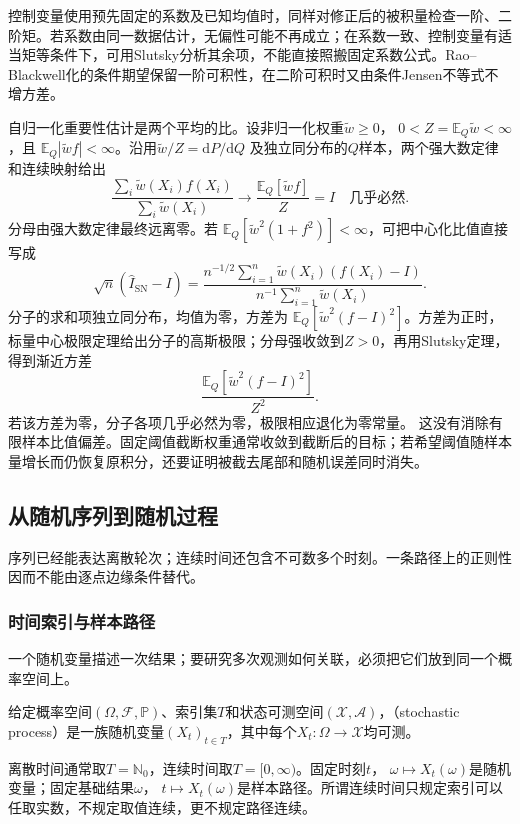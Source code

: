控制变量使用预先固定的系数及已知均值时，同样对修正后的被积量检查一阶、二阶矩。若系数由同一数据估计，无偏性可能不再成立；在系数一致、控制变量有适当矩等条件下，可用Slutsky分析其余项，不能直接照搬固定系数公式。Rao--Blackwell化的条件期望保留一阶可积性，在二阶可积时又由条件Jensen不等式不增方差。

自归一化重要性估计是两个平均的比。设非归一化权重\(\widetilde w\geq0\)，
\(0<Z=\mathbb E_Q\widetilde w<\infty\)，且
\(\mathbb E_Q|\widetilde wf|<\infty\)。沿用\(\widetilde w/Z=\mathrm dP/\mathrm dQ\)
及独立同分布的\(Q\)样本，两个强大数定律和连续映射给出
\[
\frac{\sum_i\widetilde w(X_i)f(X_i)}
{\sum_i\widetilde w(X_i)}
\longrightarrow
\frac{\mathbb E_Q[\widetilde wf]}Z=I
\quad\text{几乎必然}.
\]
分母由强大数定律最终远离零。若
\(\mathbb E_Q[\widetilde w^2(1+f^2)]<\infty\)，可把中心化比值直接写成
\[
 \sqrt n(\widehat I_{\mathrm{SN}}-I)
 =\frac{n^{-1/2}\sum_{i=1}^n
       \widetilde w(X_i)(f(X_i)-I)}
       {n^{-1}\sum_{i=1}^n\widetilde w(X_i)}.
\]
分子的求和项独立同分布，均值为零，方差为
\(\mathbb E_Q[\widetilde w^2(f-I)^2]\)。方差为正时，标量中心极限定理给出分子的高斯极限；分母强收敛到\(Z>0\)，再用Slutsky定理，得到渐近方差
\[
\frac{\mathbb E_Q[\widetilde w^2(f-I)^2]}{Z^2}.
\]
若该方差为零，分子各项几乎必然为零，极限相应退化为零常量。
这没有消除有限样本比值偏差。固定阈值截断权重通常收敛到截断后的目标；若希望阈值随样本量增长而仍恢复原积分，还要证明被截去尾部和随机误差同时消失。

\subsection{从随机序列到随机过程}
\label{sec:stoch-process-joint-laws}
序列已经能表达离散轮次；连续时间还包含不可数多个时刻。一条路径上的正则性因而不能由逐点边缘条件替代。

\subsubsection{时间索引与样本路径}
\label{sec:rv-paths}
一个随机变量描述一次结果；要研究多次观测如何关联，必须把它们放到同一个概率空间上。
\begin{definition}[随机过程]
  \label{def:stoch-process}
  给定概率空间\((\Omega,\mathcal F,\mathbb P)\)、索引集\(T\)和状态可测空间\((\mathcal X,\mathcal A)\)，（stochastic process）是一族随机变量\((X_t)_{t\in T}\)，其中每个\(X_t:\Omega\to\mathcal X\)均可测。
\end{definition}
离散时间通常取\(T=\mathbb N_0\)，连续时间取\(T=[0,\infty)\)。固定时刻\(t\)，
\(\omega\mapsto X_t(\omega)\)是随机变量；固定基础结果\(\omega\)，
\(t\mapsto X_t(\omega)\)是样本路径。所谓连续时间只规定索引可以任取实数，不规定取值连续，更不规定路径连续。

